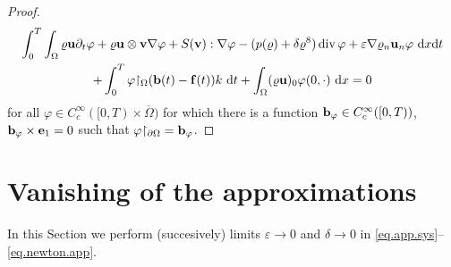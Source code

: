 \documentclass{article}
\DeclareMathOperator{\diver}{div}
\newcommand{\bb}{{\bf b}}
\newcommand{\vb}{\bb}
\newcommand{\be}{{\bf e}}
\newcommand{\ve}{\be}
\newcommand{\vf}{{\bf f}}
\newcommand{\bu}{{\bf u}}
\newcommand{\vu}{\bu}
\newcommand{\bv}{{\bf v}}
\newcommand{\vv}{\bv}
\newcommand{\pat}{\partial_t}
\numberwithin{equation}{section}
\begin{document}
\begin{proof}
\begin{multline*}
\int_0^T\int_\Omega \varrho \vu \pat \varphi + \varrho\vu \otimes\vv \nabla\varphi + S(\vv):\nabla\varphi - (p(\varrho) + \delta\varrho^8)\diver \varphi + \varepsilon \nabla \varrho_n \vu_n \varphi \ {\rm d}x{\rm d}t\\
%
 + \int_0^T\varphi{\restriction_\Omega}(\vb(t) - \vf(t)) k\ {\rm d}t + \int_\Omega (\varrho\vu)_0 \varphi(0,\cdot)\ {\rm d}x = 0
\end{multline*}
for all $\varphi\in C^\infty_c([0,T)\times \overline\Omega)$ for which there is a function $\vb_\varphi \in  C^\infty_c([0,T))$, $\vb_\varphi\times \ve_1 = 0$ such that $\varphi{\restriction_{\partial\Omega}} = \vb_\varphi$.




\end{proof}

\section{Vanishing of the approximations} \label{tend.to.zero}
In this Section we perform (succesively) limits $\varepsilon\to 0$ and $\delta\to 0$ in \eqref{eq.app.sys}--\eqref{eq.newton.app}.
\end{document}
